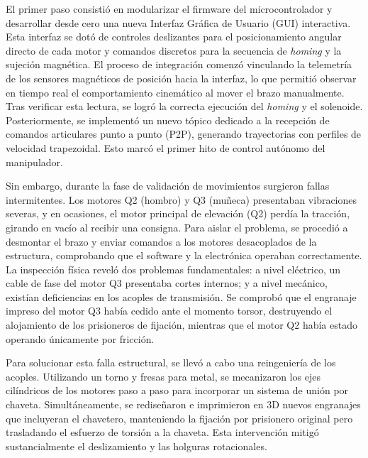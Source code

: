 \documentclass[12pt, a4paper]{report}
\begin{document}
El primer paso consistió en modularizar el firmware del microcontrolador y desarrollar desde cero una nueva Interfaz Gráfica de Usuario (GUI) interactiva. Esta interfaz se dotó de controles deslizantes para el posicionamiento angular directo de cada motor y comandos discretos para la secuencia de \textit{homing} y la sujeción magnética. El proceso de integración comenzó vinculando la telemetría de los sensores magnéticos de posición hacia la interfaz, lo que permitió observar en tiempo real el comportamiento cinemático al mover el brazo manualmente. Tras verificar esta lectura, se logró la correcta ejecución del \textit{homing} y el solenoide. Posteriormente, se implementó un nuevo tópico dedicado a la recepción de comandos articulares punto a punto (P2P), generando trayectorias con perfiles de velocidad trapezoidal. Esto marcó el primer hito de control autónomo del manipulador.

Sin embargo, durante la fase de validación de movimientos surgieron fallas intermitentes. Los motores Q2 (hombro) y Q3 (muñeca) presentaban vibraciones severas, y en ocasiones, el motor principal de elevación (Q2) perdía la tracción, girando en vacío al recibir una consigna. Para aislar el problema, se procedió a desmontar el brazo y enviar comandos a los motores desacoplados de la estructura, comprobando que el software y la electrónica operaban correctamente. La inspección física reveló dos problemas fundamentales: a nivel eléctrico, un cable de fase del motor Q3 presentaba cortes internos; y a nivel mecánico, existían deficiencias en los acoples de transmisión. Se comprobó que el engranaje impreso del motor Q3 había cedido ante el momento torsor, destruyendo el alojamiento de los prisioneros de fijación, mientras que el motor Q2 había estado operando únicamente por fricción.

Para solucionar esta falla estructural, se llevó a cabo una reingeniería de los acoples. Utilizando un torno y fresas para metal, se mecanizaron los ejes cilíndricos de los motores paso a paso para incorporar un sistema de unión por chaveta. Simultáneamente, se rediseñaron e imprimieron en 3D nuevos engranajes que incluyeran el chavetero, manteniendo la fijación por prisionero original pero trasladando el esfuerzo de torsión a la chaveta. Esta intervención mitigó sustancialmente el deslizamiento y las holguras rotacionales.
\end{document}
